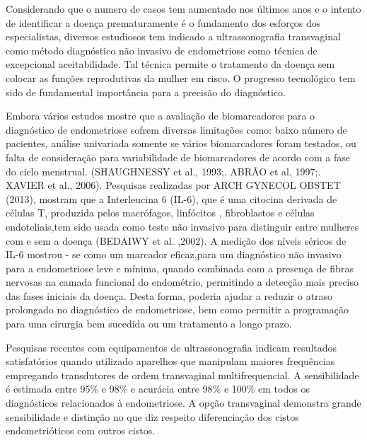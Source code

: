 \documentclass[12pt]{article} %
\begin{document}
Considerando que o numero de casos tem aumentado nos últimos anos e o intento de
identificar a doença prematuramente é o fundamento dos esforços dos especialistas, diversos estudiosos tem indicado a ultrassonografia transvaginal como método diagnóstico não invasivo de endometriose como técnica de excepcional aceitabilidade.  Tal técnica permite o tratamento da doença sem colocar as funções reprodutivas da mulher em risco. O progresso tecnológico tem sido de fundamental importância para a precisão do diagnóstico.

Embora vários estudos mostre que a avaliação de biomarcadores para o diagnóstico de endometriose sofrem diversas limitações como: baixo número de pacientes, análise univariada somente se vários biomarcadores foram testados, ou falta de consideração para variabilidade de biomarcadores de acordo com a fase do ciclo menstrual. (SHAUGHNESSY et al., 1993;. ABRÃO et al, 1997;. XAVIER et al., 2006).
Pesquisas realizadas por ARCH GYNECOL OBSTET (2013), mostram que a Interleucina 6 (IL-6), que é uma citocina derivada de células T, produzida pelos macrófagos, linfócitos , fibroblastos e células endoteliais,tem sido usada como teste não invasivo para distinguir entre mulheres com e sem a doença (BEDAIWY et al. ,2002). A medição dos níveis séricos de
IL-6 mostrou - se como um marcador eficaz,para um diagnóstico não invasivo para a endometriose leve e mínima, quando combinada com a presença de fibras nervosas na camada funcional do endométrio, permitindo a detecção mais preciso das fases iniciais da doença. Desta forma,  poderia ajudar a
reduzir o atraso prolongado no diagnóstico de endometriose,
bem como permitir a programação para uma cirurgia bem sucedida ou um tratamento a longo prazo.


Pesquisas recentes com equipamentos de ultrassonografia indicam resultados satisfatórios quando utilizado aparelhos que manipulam maiores frequências empregando transdutores de ordem transvaginal multifrequencial. A sensibilidade é estimada entre 95\% e 98\% e acurácia entre 98\% e 100\% em todos os diagnósticos relacionados à endometriose. A opção transvaginal demonstra grande sensibilidade e distinção no que diz respeito diferenciação dos cistos endometrióticos com outros cistos.
\end{document}

